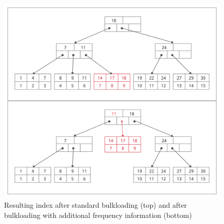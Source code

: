\begin{figure}
    \centering
    \includegraphics[width=\textwidth]{figures/frequency_bulkloading.png}
    \caption[Incorporating frequency information into index bulkloading]{Resulting index after standard bulkloading (top) and after bulkloading with additional frequency information (bottom)}
    \label{fig:frequencybulkload}
\end{figure}